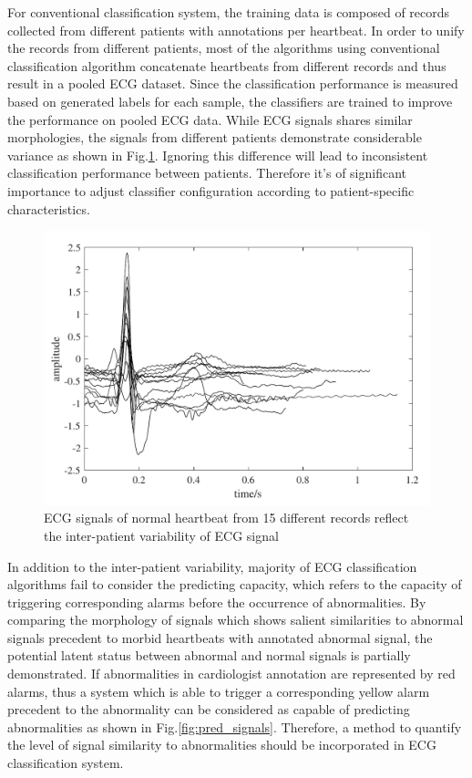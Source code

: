 For conventional classification system, the training data is composed of records collected from different patients with annotations per heartbeat. In order to unify the records from different patients, most of the algorithms using conventional classification algorithm concatenate heartbeats from different records and thus result in a pooled ECG dataset. Since the classification performance is measured based on generated labels for each sample, the classifiers are trained to improve the performance on pooled ECG data. While ECG signals shares similar morphologies, the signals from different patients demonstrate considerable variance as shown in Fig.\ref{fig:interpatient_variability}. Ignoring this difference will lead to inconsistent classification performance between patients. Therefore it's of significant importance to adjust classifier configuration according to patient-specific characteristics.  %

 \begin{figure}[thpb]
 	\centering
 	\includegraphics[scale=0.7]{Fig/interpatient_variability.pdf}
 	\caption{ECG signals of normal heartbeat from 15 different records reflect the inter-patient variability of ECG signal}
 	\label{fig:interpatient_variability}
 \end{figure}

In addition to the inter-patient variability, majority of ECG classification algorithms fail to consider the predicting capacity, which refers to the capacity of triggering corresponding alarms before the occurrence of abnormalities. By comparing the morphology of signals which shows salient similarities to abnormal signals precedent to morbid heartbeats with annotated abnormal signal, the potential latent status between abnormal and normal signals is partially demonstrated. If abnormalities in cardiologist annotation are represented by red alarms, thus a system which is able to trigger a corresponding yellow alarm precedent to the abnormality can be considered as capable of predicting abnormalities as shown in Fig.\ref{fig:pred_signals}. Therefore, a method to quantify the level of signal similarity to abnormalities should be incorporated in ECG classification system.

